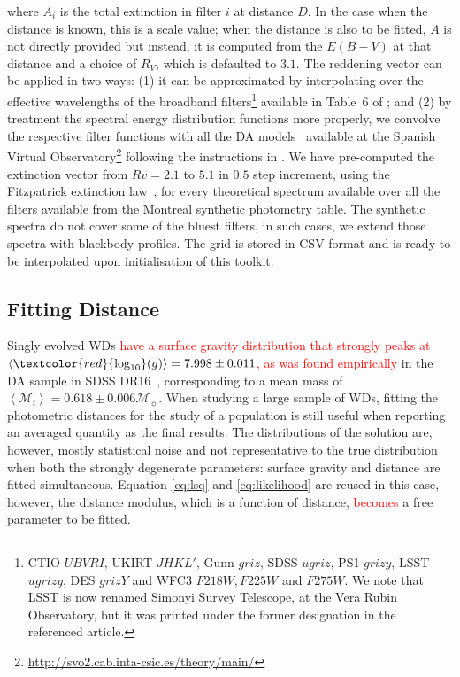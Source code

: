 \documentclass[fleqn,usenatbib]{rasti}
\newcommand{\msun}{\mathcal{M}_{\sun}}
\begin{document}
where $A_i$ is the total extinction in filter $i$ at distance $D$. In the case
when the distance is known, this is a scale value; when the distance is also
to be fitted, $A$ is not directly provided but instead, it is computed from the
$E(B-V)$ at that distance and a choice of $R_{V}$, which is defaulted to $3.1$.
The reddening vector can be applied in two ways: (1) it can be approximated by
interpolating over the effective wavelengths of the broadband
filters\footnote{CTIO $UBVRI$, UKIRT $JHKL'$, Gunn $griz$, SDSS $ugriz$,
PS1 $grizy$, LSST $ugrizy$, DES $grizY$ and WFC3 $F218W, F225W$ and $F275W$.
We note that LSST is now renamed Simonyi Survey Telescope, at the Vera Rubin
Observatory, but it was printed under the former designation in the referenced
article.} available in Table~6 of \citet{2011ApJ...737..103S}; and (2) by
treatment the spectral energy distribution functions more properly, we convolve
the respective filter functions with all the DA
models~\citep{2009ApJ...696.1755T, 2010MmSAI..81..921K} available at the
Spanish Virtual
Observatory\footnote{\url{http://svo2.cab.inta-csic.es/theory/main/}} following
the instructions in \citet{2011ApJ...737..103S}. We have pre-computed the
extinction vector from $Rv = 2.1$ to $5.1$ in $0.5$ step increment, using the
Fitzpatrick extinction law~\citep{1999PASP..111...63F}, for every theoretical
spectrum available over all the filters available from the Montreal synthetic
photometry table. The synthetic spectra do not cover some of the bluest filters,
in such cases, we extend those spectra with blackbody profiles. The grid is
stored in CSV format and is ready to be interpolated upon initialisation of
this toolkit.

\subsection{Fitting Distance}
Singly evolved WDs \textcolor{red}{have a surface gravity distribution that
strongly peaks at $\left<\textcolor{red}{\log_{10}}(g)\right> = 7.998 \pm 0.011$,
as was found empirically} in the DA sample in SDSS DR16~\citep{2021MNRAS.507.4646K},
corresponding to a mean mass of $\left<\mathcal{M}_i\right> = 0.618 \pm 0.006 \msun$.
When studying a large sample of WDs,
fitting the photometric distances for the study of a population is still
useful when reporting an averaged quantity as the final results. The
distributions of the solution are, however, mostly statistical noise and not
representative to the true distribution when both the strongly degenerate
parameters: surface gravity and distance are fitted simultaneous. Equation
\ref{eq:lsq} and \ref{eq:likelihood} are reused in this case, however, the
distance modulus, which is a function of distance, \textcolor{red}{becomes}
a free parameter to be fitted.
\end{document}
